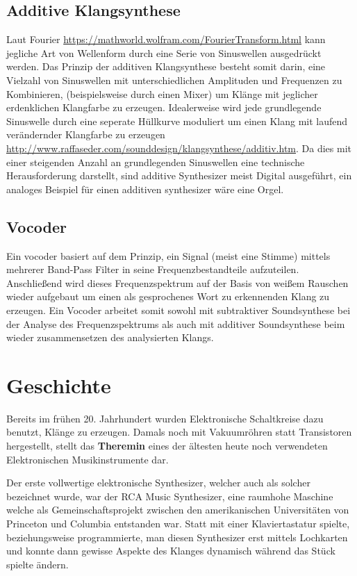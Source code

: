\subsection{Additive Klangsynthese}
\label{sec:orga01f8df}
Laut Fourier \url{https://mathworld.wolfram.com/FourierTransform.html} kann jegliche Art von Wellenform durch eine Serie von Sinuswellen ausgedrückt werden. Das Prinzip der additiven Klangsynthese besteht somit darin, eine Vielzahl von Sinuswellen mit unterschiedlichen Amplituden und Frequenzen zu Kombinieren, (beispielsweise durch einen Mixer) um Klänge mit jeglicher erdenklichen Klangfarbe zu erzeugen. Idealerweise wird jede grundlegende Sinuswelle durch eine seperate Hüllkurve moduliert um einen Klang mit laufend verändernder Klangfarbe zu erzeugen \url{http://www.raffaseder.com/sounddesign/klangsynthese/additiv.htm}. Da dies mit einer steigenden Anzahl an grundlegenden Sinuswellen eine technische Herausforderung darstellt, sind additive Synthesizer meist Digital ausgeführt, ein analoges Beispiel für einen additiven synthesizer wäre eine Orgel.

\subsection{Vocoder}
\label{sec:org086975e}
Ein vocoder basiert auf dem Prinzip, ein Signal (meist eine Stimme) mittels mehrerer Band-Pass Filter in seine Frequenzbestandteile aufzuteilen. Anschließend wird dieses Frequenzspektrum auf der Basis von weißem Rauschen wieder aufgebaut um einen als gesprochenes Wort zu erkennenden Klang zu erzeugen. Ein Vocoder arbeitet somit sowohl mit subtraktiver Soundsynthese bei der Analyse des Frequenzspektrums als auch mit additiver Soundsynthese beim wieder zusammensetzen des analysierten Klangs.

\section{Geschichte}
\label{sec:orgc2a9152}
Bereits im frühen 20. Jahrhundert wurden Elektronische Schaltkreise dazu benutzt, Klänge zu erzeugen. Damals noch mit Vakuumröhren statt Transistoren hergestellt, stellt das \textbf{Theremin} eines der ältesten heute noch verwendeten Elektronischen Musikinstrumente dar.

Der erste vollwertige elektronische Synthesizer, welcher auch als solcher bezeichnet wurde, war der RCA Music Synthesizer, eine raumhohe Maschine welche als Gemeinschaftsprojekt zwischen den amerikanischen Universitäten von Princeton und Columbia entstanden war. Statt mit einer Klaviertastatur spielte, beziehungsweise programmierte, man diesen Synthesizer erst mittels Lochkarten und konnte dann gewisse Aspekte des Klanges dynamisch während das Stück spielte ändern.

